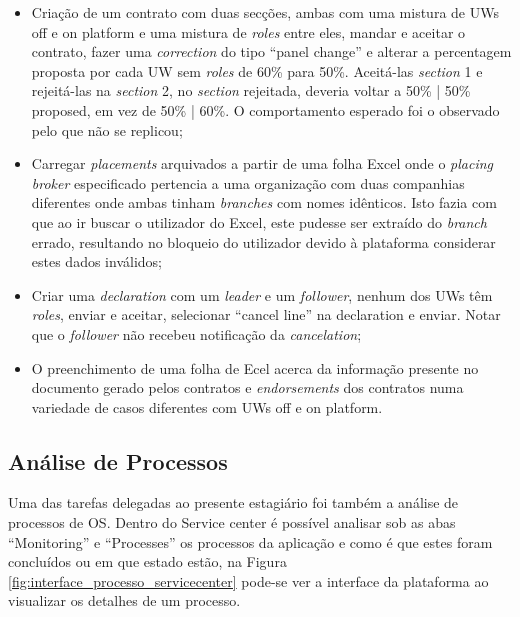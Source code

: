         \begin{itemize}
            \item Criação de um contrato com duas secções, ambas com uma mistura de UWs off e on platform e uma mistura de \textit{roles} entre eles, mandar e aceitar o contrato, fazer uma \textit{correction} do tipo ``panel change'' e alterar a percentagem proposta por cada UW sem \textit{roles} de 60\% para 50\%. Aceitá-las \textit{section} 1 e rejeitá-las na \textit{section} 2, no \textit{section} rejeitada, deveria voltar a 50\% | 50\% proposed, em vez de 50\% | 60\%. O comportamento esperado foi o observado pelo que não se replicou;
            \item Carregar \textit{placements} arquivados a partir de uma folha Excel onde o \textit{placing broker} especificado pertencia a uma organização com duas companhias diferentes onde ambas tinham \textit{branches} com nomes idênticos. Isto fazia com que ao ir buscar o utilizador do Excel, este pudesse ser extraído do \textit{branch} errado, resultando no bloqueio do utilizador devido à plataforma considerar estes dados inválidos;
            \item Criar uma \textit{declaration} com um \textit{leader} e um \textit{follower}, nenhum dos UWs têm \textit{roles}, enviar e aceitar, selecionar ``cancel line'' na declaration e enviar. Notar que o \textit{follower} não recebeu notificação da \textit{cancelation};
            \item O preenchimento de uma folha de Ecel acerca da informação presente no documento gerado pelos contratos e \textit{endorsements} dos contratos numa variedade de casos diferentes com UWs off e on platform.
        \end{itemize}

    \subsection{Análise de Processos}\label{sub:processos}

        Uma das tarefas delegadas ao presente estagiário foi também a análise de processos de OS. Dentro do Service center é possível analisar sob as abas ``Monitoring'' e ``Processes'' os processos da aplicação e como é que estes foram concluídos ou em que estado estão, na Figura \ref{fig:interface_processo_servicecenter} pode-se ver a interface da plataforma ao visualizar os detalhes de um processo.

